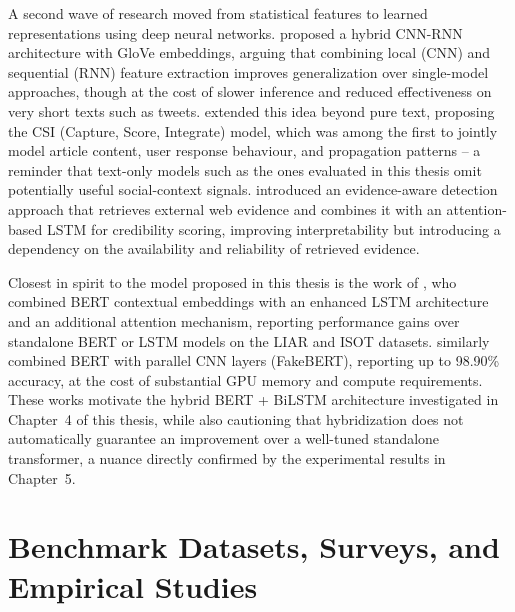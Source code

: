 A second wave of research moved from statistical features to learned representations using deep neural networks. \citet{Nasir2021FakeNews} proposed a hybrid CNN-RNN architecture with GloVe embeddings, arguing that combining local (CNN) and sequential (RNN) feature extraction improves generalization over single-model approaches, though at the cost of slower inference and reduced effectiveness on very short texts such as tweets. \citet{Ruchansky2017CSI} extended this idea beyond pure text, proposing the CSI (Capture, Score, Integrate) model, which was among the first to jointly model article content, user response behaviour, and propagation patterns -- a reminder that text-only models such as the ones evaluated in this thesis omit potentially useful social-context signals. \citet{Popat2019DeClarE} introduced an evidence-aware detection approach that retrieves external web evidence and combines it with an attention-based LSTM for credibility scoring, improving interpretability but introducing a dependency on the availability and reliability of retrieved evidence.

Closest in spirit to the model proposed in this thesis is the work of \citet{Rai2022FakeNews}, who combined BERT contextual embeddings with an enhanced LSTM architecture and an additional attention mechanism, reporting performance gains over standalone BERT or LSTM models on the LIAR and ISOT datasets. \citet{Kaliyar2021FakeBERT} similarly combined BERT with parallel CNN layers (FakeBERT), reporting up to 98.90\% accuracy, at the cost of substantial GPU memory and compute requirements. These works motivate the hybrid BERT + BiLSTM architecture investigated in Chapter~4 of this thesis, while also cautioning that hybridization does not automatically guarantee an improvement over a well-tuned standalone transformer, a nuance directly confirmed by the experimental results in Chapter~5.

\section{Benchmark Datasets, Surveys, and Empirical Studies}

